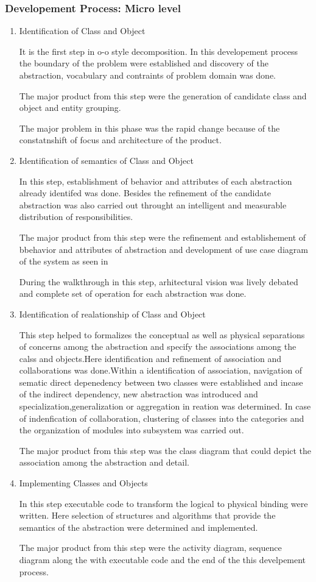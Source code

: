 \documentclass[a4paper,12pt,onepage]{article}
\begin{document}
\subsubsection{Developement Process: Micro level}
\begin{enumerate}
\item Identification of Class and Object
\par
It is the first step in o-o style decomposition. In this developement process the boundary of the problem were established and discovery of the abstraction, vocabulary and contraints of problem domain was done.
\par
The major product from this step were the generation of candidate class and object and entity grouping.
\par 
The major problem in this phase was the rapid change because of the constatnshift of focus and architecture of the product.
\newpage
\item Identification of semantics of Class and Object
\par
In this step, establishment of behavior and attributes of each abstraction already identifed was done. Besides the refinement of the candidate abstraction was also carried out throught an intelligent and measurable distribution of responsibilities.
\par
The major product from this step were the refinement and establishement of bbehavior and attributes of abstraction and development of use case diagram of the system as seen in 
\par
During the walkthrough in this step, arhitectural vision was lively debated and complete set of operation for each abstraction was done.
\newpage
\item Identification of realationship of Class and Object
\par
This step helped to formalizes the conceptual as well as physical separations of concerns among the abstraction and specify the associations among the calss and objects.Here identification and refinement of association and collaborations was done.Within a identification of association, navigation of sematic direct depenedency between two classes were established and incase of the indirect dependency, new abstraction was introduced and specialization,generalization or aggregation in reation was determined. In case of indenfication of collaboration, clustering of classes into the categories and the organization of modules into subsystem was carried out.

\par
The major product from this step was the class diagram that could depict the association among the abstraction and detail.
\newpage
\item Implementing Classes and Objects
\par
In this step executable code to transform the logical to physical binding were written. Here selection of structures and algorithms that provide the semantics of the abstraction were determined and implemented.
\par 
The major product from this step were the activity diagram, sequence diagram along the with executable code and the end of the this develpement process.
\newpage
\end{enumerate}
\end{document}
